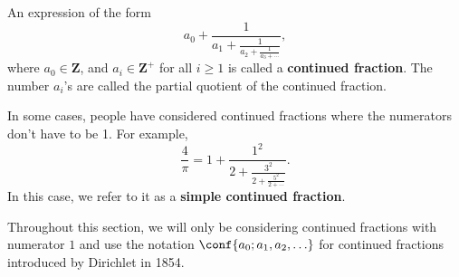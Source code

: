 \begin{Definition}{}{}
    An expression of the form
    \[ a_0+\frac{1}{a_1+\frac{1}{a_2+\frac{1}{a_3+\cdots}}}, \]
    where $ a_0\in\mathbf{Z} $, and $ a_i\in\mathbf{Z}^+ $ for all $ i\ge 1 $
    is called a \textbf{continued fraction}.
    The number $ a_i $'s are called the partial quotient of the continued fraction.
\end{Definition}
\begin{Remark}{}{}
    In some cases, people have considered continued fractions where the
    numerators don't have to be 1. For example,
    \[ \frac{4}{\pi}=1+\frac{1^2}{2+\frac{3^2}{2+\frac{5^2}{2+\cdots}}}. \]
    In this case, we refer to it as a \textbf{simple continued fraction}.
\end{Remark}
Throughout this section, we will only
be considering continued fractions with numerator $ 1 $
and use the notation $ \conf{a_0;a_1,a_2,\ldots} $
for continued fractions
introduced by Dirichlet in 1854.

